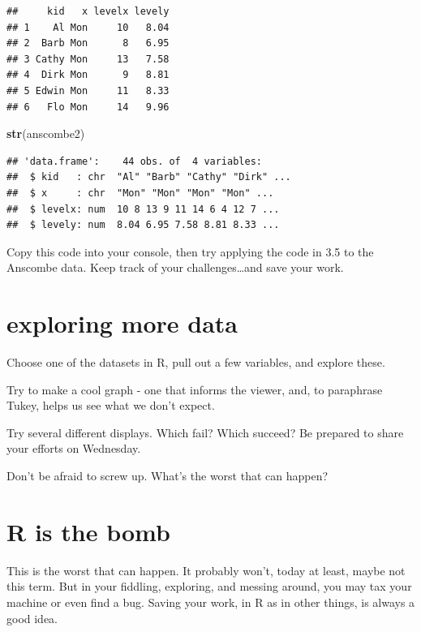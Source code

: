 \documentclass[
  openany]{book}
\newenvironment{Shaded}{\begin{snugshade}}{\end{snugshade}}
\newcommand{\KeywordTok}[1]{\textcolor[rgb]{0.13,0.29,0.53}{\textbf{#1}}}
\newcommand{\NormalTok}[1]{#1}
\begin{document}
\begin{verbatim}
##     kid   x levelx levely
## 1    Al Mon     10   8.04
## 2  Barb Mon      8   6.95
## 3 Cathy Mon     13   7.58
## 4  Dirk Mon      9   8.81
## 5 Edwin Mon     11   8.33
## 6   Flo Mon     14   9.96
\end{verbatim}

\begin{Shaded}
\begin{Highlighting}[]
\KeywordTok{str}\NormalTok{(anscombe2)}
\end{Highlighting}
\end{Shaded}

\begin{verbatim}
## 'data.frame':    44 obs. of  4 variables:
##  $ kid   : chr  "Al" "Barb" "Cathy" "Dirk" ...
##  $ x     : chr  "Mon" "Mon" "Mon" "Mon" ...
##  $ levelx: num  10 8 13 9 11 14 6 4 12 7 ...
##  $ levely: num  8.04 6.95 7.58 8.81 8.33 ...
\end{verbatim}

Copy this code into your console, then try applying the code in 3.5 to the Anscombe data. Keep track of your challenges\ldots and save your work.

\hypertarget{exploring-more-data}{%
\section{exploring more data}\label{exploring-more-data}}

Choose one of the datasets in R, pull out a few variables, and explore these.

Try to make a cool graph - one that informs the viewer, and, to paraphrase Tukey, helps us see what we don't expect.

Try several different displays. Which fail? Which succeed? Be prepared to share your efforts on Wednesday.

Don't be afraid to screw up. What's the worst that can happen?

\hypertarget{r-is-the-bomb}{%
\section{R is the bomb}\label{r-is-the-bomb}}

This is the worst that can happen. It probably won't, today at least, maybe not this term. But in your fiddling, exploring, and messing around, you may tax your machine or even find a bug. Saving your work, in R as in other things, is always a good idea.
\end{document}
